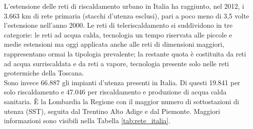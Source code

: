 \documentclass[laurea,oneside,11pt]{USiena_tesiLM}
\begin{document}
L'estensione delle reti di riscaldamento urbano in Italia ha raggiunto, nel 2012, i 3.663 km di rete primaria (stacchi d'utenza esclusi), pari a poco meno di 3,5 volte l'estensione nell'anno 2000.
Le reti di teleriscaldamento si suddividono in tre categorie: le reti ad acqua calda, tecnologia un tempo riservata alle piccole e medie estensioni ma oggi applicata anche alle reti di dimensioni maggiori, rappresentano ormai la tipologia prevalente; la restante quota è costituita da reti ad acqua surriscaldata e da reti a vapore, tecnologia presente solo nelle reti geotermiche della Toscana.\\

Sono invece 66.887 gli impianti d'utenza presenti in Italia. Di questi 19.841 per solo riscaldamento e 47.046 per riscaldamento e
produzione di acqua calda sanitaria. \`E la Lombardia la Regione con il maggior numero di sottostazioni di utenza (SST), seguita dal Trentino Alto Adige e dal Piemonte. Maggiori informazioni sono visibili nella Tabella \ref{tab:rete_italia}.
\end{document}
